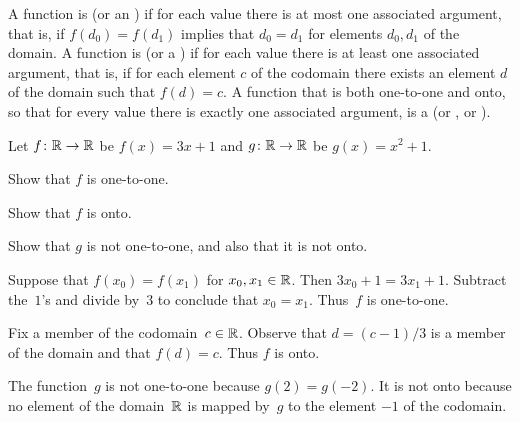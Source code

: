 \documentclass{ibl}  %
\begin{document}
\begin{df}
A function is  (or an ) 
if for each value there is at most
one associated argument, that is, if $f(d_0)=f(d_1)$ implies that $d_0=d_1$
for elements $d_0,d_1$ of the domain.
A function is  (or a ) 
if for each value there is at least
one associated argument, that is, if for each element $c$ of the codomain
there exists an element $d$ of the domain such that $f(d)=c$.
A function that is both one-to-one and onto, so that for every value there
is exactly one associated argument, is a 
 (or , or ).
\end{df}

\begin{ex} Let $\mbox{$f\colon \mathbb{R}\to \mathbb{R}$}$ be $f(x)=3x+1$ and 
  $\mbox{$g\colon \mathbb{R}\to \mathbb{R}$}$ be $g(x)=x^2+1$.
\begin{exes}
\item Show that $f$ is one-to-one.
\item Show that $f$ is onto.    
\item Show that $g$ is not one-to-one, and also that it is not onto.
\end{exes}
\begin{ans}
\begin{exes}
\item Suppose that $f(x_0)=f(x_1)$ for $x_0,x_1\in\mathbb{R}$.
  Then $3x_0+1=3x_1+1$.
  Subtract the~$1$'s and divide by~$3$ to conclude that $x_0=x_1$.
  Thus~$f$ is one-to-one. 
\item Fix a member of the codomain~$c\in\mathbb{R}$.
  Observe that $d=(c-1)/3$ is a member of the domain and that 
  $f(d)=c$.
  Thus $f$ is onto.
\item The function~$g$ is not one-to-one because $g(2)=g(-2)$.
  It is not onto because no element of the domain~$\mathbb{R}$ is mapped by~$g$
  to the element $-1$ of the codomain.        
\end{exes}
\end{ans}
\end{ex}
\end{document}
